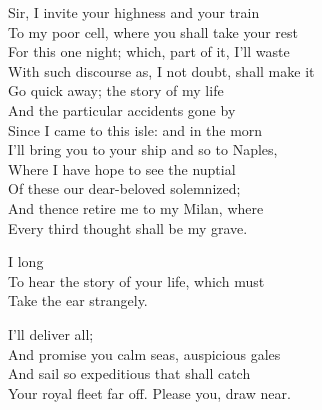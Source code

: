


\begin{verse_speech}[Prospero] 
Sir, I invite your highness and your train\\
To my poor cell, where you shall take your rest\\
For this one night; which, part of it, I'll waste\\
With such discourse as, I not doubt, shall make it\\
Go quick away; the story of my life\\
And the particular accidents gone by\\
Since I came to this isle: and in the morn\\
I'll bring you to your ship and so to Naples,\\
Where I have hope to see the nuptial\\
Of these our dear-beloved solemnized;\\
And thence retire me to my Milan, where\\
Every third thought shall be my grave.
\end{verse_speech}

\begin{verse_speech}[Alonso] 
I long\\
To hear the story of your life, which must\\
Take the ear strangely.
\end{verse_speech}

\begin{verse_speech}[Prospero] 
I'll deliver all;\\
And promise you calm seas, auspicious gales\\
And sail so expeditious that shall catch\\
Your royal fleet far off.
Please you, draw near.
\end{verse_speech}

